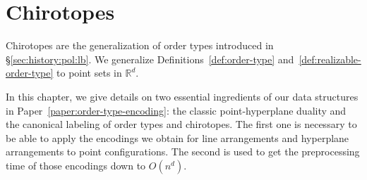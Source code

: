 \chapter{Chirotopes}%
\label{chapter:chirotopes}

Chirotopes are the generalization of order types introduced in
\S\ref{sec:history:pol:lb}.
%
We generalize Definitions~\ref{def:order-type}
and~\ref{def:realizable-order-type} to point sets in \(\mathbb{R}^d\).
%


In this chapter,
we give details on two essential ingredients of our data structures in
Paper~\ref{paper:order-type-encoding}:
the classic point-hyperplane duality
and
the canonical labeling of order types and chirotopes.
%
The first one is necessary to be able to apply the encodings we obtain
for line arrangements
and hyperplane arrangements to point configurations.
%
The second is used to get the preprocessing time of those encodings down to
\(O(n^d)\).




